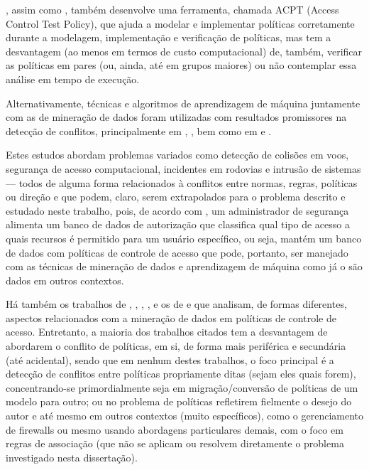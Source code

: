 \documentclass[
	12pt,				%
	openright,			%
	oneside,			%
	a4paper,			%
	english,			%
	french,				%
	spanish,			%
	brazil				%
	]{abntex2}
\begin{document}
, assim como , também desenvolve uma ferramenta, chamada ACPT (Access Control Test Policy), que ajuda a modelar e implementar políticas corretamente durante a modelagem, implementação e verificação de políticas, mas tem a desvantagem (ao menos em termos de custo computacional) de, também, verificar as políticas em pares (ou, ainda, até em grupos maiores) ou não contemplar essa análise em tempo de execução.

Alternativamente, técnicas e algoritmos de aprendizagem de máquina juntamente com as de mineração de dados foram utilizadas com resultados promissores na detecção de conflitos, principalmente em , , bem como em  e . 

Estes estudos abordam problemas variados como detecção de colisões em voos, segurança de acesso computacional, incidentes em rodovias e intrusão de sistemas — todos de alguma forma relacionados à conflitos entre normas, regras, políticas ou direção e que podem, claro, serem extrapolados para o problema descrito e estudado neste trabalho, pois, de acordo com , um administrador de segurança alimenta um banco de dados de autorização que classifica qual tipo de acesso a quais recursos é permitido para um usuário específico, ou seja, mantém um banco de dados com políticas de controle de acesso que pode, portanto, ser manejado com as técnicas de mineração de dados e aprendizagem de máquina como já o são dados em outros contextos.

Há também os trabalhos de , , , ,  e os de  e  que analisam, de formas diferentes, aspectos relacionados com a mineração de dados em políticas de controle de acesso. Entretanto, a maioria dos trabalhos citados tem a desvantagem de abordarem o conflito de políticas, em si, de forma mais periférica e secundária (até acidental), sendo que em nenhum destes trabalhos, o foco principal é a detecção de conflitos entre políticas propriamente ditas (sejam eles quais forem), concentrando-se primordialmente seja em migração/conversão de políticas de um modelo para outro; ou no problema de políticas refletirem fielmente o desejo do autor e até mesmo em outros contextos (muito específicos), como o gerenciamento de firewalls ou mesmo usando abordagens particulares demais, com o foco em regras de associação (que não se aplicam ou resolvem diretamente o problema investigado nesta dissertação).
\end{document}
